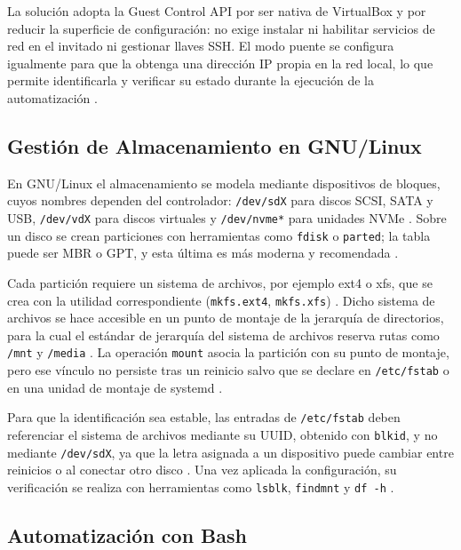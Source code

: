 La solución adopta la Guest Control API por ser nativa de VirtualBox y por reducir la superficie de configuración: no exige instalar ni habilitar servicios de red en el invitado ni gestionar llaves SSH. El modo puente se configura igualmente para que la \vm{} obtenga una dirección IP propia en la red local, lo que permite identificarla y verificar su estado durante la ejecución de la automatización \parencite{virtualbox_networking, virtualbox_guestcontrol}.

\subsection{Gestión de Almacenamiento en GNU/Linux}

En GNU/Linux el almacenamiento se modela mediante dispositivos de bloques, cuyos nombres dependen del controlador: \texttt{/dev/sdX} para discos SCSI, SATA y USB, \texttt{/dev/vdX} para discos virtuales y \texttt{/dev/nvme*} para unidades NVMe \parencite{kernel_block_devices}. Sobre un disco se crean particiones con herramientas como \texttt{fdisk} o \texttt{parted}; la tabla puede ser MBR o GPT, y esta última es más moderna y recomendada \parencite{linux_storage_management}.

Cada partición requiere un sistema de archivos, por ejemplo ext4 o xfs, que se crea con la utilidad correspondiente (\texttt{mkfs.ext4}, \texttt{mkfs.xfs}) \parencite{linux_storage_management}. Dicho sistema de archivos se hace accesible en un punto de montaje de la jerarquía de directorios, para la cual el estándar de jerarquía del sistema de archivos reserva rutas como \texttt{/mnt} y \texttt{/media} \parencite{lsb_fhs}. La operación \texttt{mount} asocia la partición con su punto de montaje, pero ese vínculo no persiste tras un reinicio salvo que se declare en \texttt{/etc/fstab} o en una unidad de montaje de systemd \parencite{linux_storage_management, systemd_mount}.

Para que la identificación sea estable, las entradas de \texttt{/etc/fstab} deben referenciar el sistema de archivos mediante su UUID, obtenido con \texttt{blkid}, y no mediante \texttt{/dev/sdX}, ya que la letra asignada a un dispositivo puede cambiar entre reinicios o al conectar otro disco \parencite{uuid_fstab}. Una vez aplicada la configuración, su verificación se realiza con herramientas como \texttt{lsblk}, \texttt{findmnt} y \texttt{df -h} \parencite{linux_storage_management}.

\subsection{Automatización con Bash}
\label{sub:bash}

